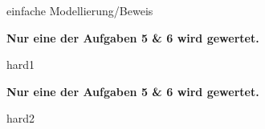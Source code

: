 \documentclass[a4paper]{article}
\begin{document}
\pagebreak
\begin{klaufg}{8}{einfache Modellierung/Beweis}

  
\end{klaufg}
 
\pagebreak
{\bfseries Nur eine der Aufgaben 5 \& 6 wird gewertet.}
\bigskip
\bigskip

\begin{klaufg}{8}{hard1}

\end{klaufg}

\pagebreak
{\bfseries Nur eine der Aufgaben 5 \& 6 wird gewertet.}
\bigskip
\bigskip

\begin{klaufg}{8}{hard2}

\end{klaufg}
\end{document}
